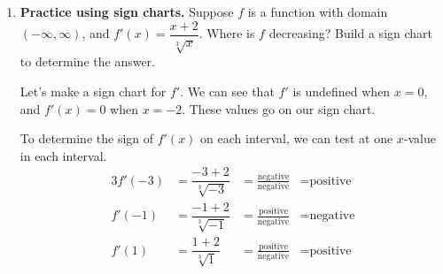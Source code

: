 \documentclass[main]{subfiles}
\providecommand{\fitb}[3][\ ]{\underline{\hspace{#2}}}
\begin{document}
\begin{enumerate}[resume]
\begin{enumerate}[resume]
{      This is the last part that's important to cover today.
    }

    \begin{problem}[0.15in]
     \textbf{Key Skill:} There are many situations  where we want to determine the sign of a function.  If you want to make a \textbf{sign chart} for $g(x)$ and $g(x)$ is given by a single (non-piecewise) algebraic formula, you should start by finding values of $x$ where $g(x)$ is \fitb[$\vphantom{\displaystyle \dfrac{1}{1}}$]{2.5in}{0 or undefined}. 
    \end{problem}

  \end{enumerate}

\item 

  \begin{problem}[\vfill]
    \textbf{Practice using sign charts.} Suppose $f$ is a function with domain $(-\infty, \infty)$, and $f'(x) = \dfrac{x + 2}{\sqrt[3]{x}}$. Where is $f$ decreasing? Build a sign chart to determine the answer.
  \end{problem}

  \begin{solution}
    Let's make a sign chart for $f'$. We can see that $f'$ is undefined when $x=0$, and
    $f'(x)=0$ when $x=-2$. These values go on our sign chart.

      \begin{center}
      \end{center}

      To determine the sign of $f'(x)$ on each interval, we can test at one $x$-value in
      each interval.
      \begin{alignat*}{3}
      f'(-3) &= \dfrac{-3+2}{\sqrt[3]{-3}} &=\frac{\text{negative}}{\text{negative}} 
      &= \text{positive} \\
      f'(-1) &= \dfrac{-1+2}{\sqrt[3]{-1}} &=\frac{\text{positive}}{\text{negative}}
      &= \text{negative} \\
      f'(1) &= \dfrac{1+2}{\sqrt[3]{1}} &=\frac{\text{positive}}{\text{negative}}
      &= \text{positive}
      \end{alignat*}


\end{solution}
\end{enumerate}
\end{document}
